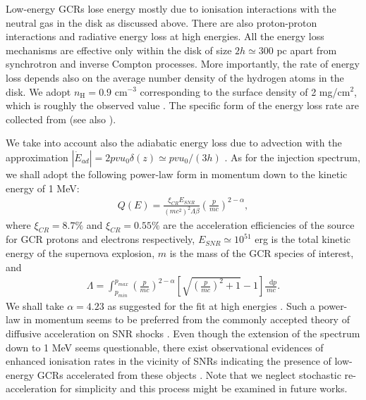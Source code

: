 \documentclass[%
reprint,
amsmath,amssymb,
aps,
superscriptaddress,
preprintnumbers
]{revtex4-2}
\newcommand*\df{\mathop{}\!\mathrm{d}}
\begin{document}
Low-energy GCRs lose energy mostly due to ionisation interactions with the neutral gas in the disk as discussed above. There are also proton-proton interactions and radiative energy loss at high energies. All the energy loss mechanisms are effective only within the disk of size $2h\simeq 300$ pc apart from synchrotron and inverse Compton processes. More importantly, the rate of energy loss depends also on the average number density of the hydrogen atoms in the disk. We adopt $n_\text{H}=0.9$ cm$^{-3}$ corresponding to the surface density of 2 mg/cm$^{2}$, which is roughly the observed value \citep{ferriere2001}. The specific form of the energy loss rate are collected from \citep{schlickeiser2002,mertsch2011,krakau2015,evoli2017} (see also \cite{Note1}). 

We take into account also the adiabatic energy loss due to advection with the approximation $|\dot{E}_{ad}|=2pv u_0\delta(z) \simeq pv u_0/(3h)$ \cite{jaupart2018}. As for the injection spectrum, we shall adopt the following power-law form in momentum down to the kinetic energy of 1 MeV:
%
\begin{eqnarray}
Q(E)=\frac{\xi_{CR}E_{SNR}}{(mc^2)^2\Lambda\beta}\left(\frac{p}{mc}\right)^{2-\alpha},\label{eq:source_function}
\end{eqnarray} 
%
where $\xi_{CR}=8.7\%$ and $\xi_{CR}=0.55\%$ are the acceleration efficiencies of the source for GCR protons and electrons respectively, $E_{SNR}\simeq 10^{51}$ erg is the total kinetic energy of the supernova explosion, $m$ is the mass of the GCR species of interest, and
%
\begin{eqnarray}
\Lambda=\int^{p_{max}}_{p_{min}}\left(\frac{p}{mc}\right)^{2-\alpha}\left[\sqrt{\left(\frac{p}{mc}\right)^2+1}-1\right]\frac{\df p}{mc}.\label{eq:Lambda_Q}
\end{eqnarray}
%
We shall take $\alpha=4.23$ as suggested for the fit at high energies \cite{evoli2019}. Such a power-law in momentum seems to be preferred from the commonly accepted theory of diffusive acceleration on SNR shocks \citep{malkov2001,blasi2013}. Even though the extension of the spectrum down to 1 MeV seems questionable, there exist observational evidences of enhanced ionisation rates in the vicinity of SNRs indicating the presence of low-energy GCRs accelerated from these objects \citep{vaupre2014,gabici2015,phan2020}. Note that we neglect stochastic re-acceleration for simplicity and this process might be examined in future works. 
\end{document}
